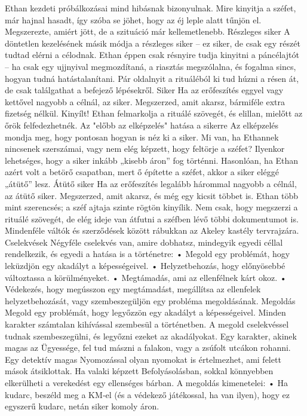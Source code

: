 \documentclass[oneside]{book}
\begin{document}
Ethan kezdeti próbálkozásai mind hibásnak bizonyulnak. Mire kinyitja a széfet, már hajnal hasadt, így szóba se jöhet, hogy az éj leple alatt tűnjön el. Megszerezte, amiért jött, de a szituáció már kellemetlenebb.
Részleges siker
A döntetlen kezelésének másik módja a részleges siker – ez siker, de csak egy részét tudtad elérni a célodnak.
Ethan éppen csak résnyire tudja kinyitni a páncélajtót – ha csak egy ujjnyival megmozdítaná, a riasztás megszólalna, és fogalma sincs, hogyan tudná hatástalanítani. Pár oldalnyit a rituáléból ki tud húzni a résen át, de csak találgathat a befejező lépésekről.
Siker
Ha az erőfeszítés eggyel vagy kettővel nagyobb a célnál, az siker.
Megszerzed, amit akarsz, bármiféle extra fizetség nélkül.
Kinyílt! Ethan felmarkolja a rituálé szövegét, és elillan, mielőtt az őrök felfedezhetnék.
Az "előbb az elképzelés" hatása a sikerre
Az elképzelés mondja meg, hogy pontosan hogyan is néz ki a siker. Mi van, ha Ethannek nincsenek szerszámai, vagy nem elég képzett, hogy feltörje a széfet? Ilyenkor lehetséges, hogy a siker inkább „kisebb áron” fog történni. Hasonlóan, ha Ethan azért volt a betörő csapatban, mert ő építette a széfet, akkor a siker eléggé „átütő” lesz.
Átütő siker
Ha az erőfeszítés legalább hárommal nagyobb a célnál, az átütő siker.
Megszerzed, amit akarsz, és még egy kicsit többet is.
Ethan több mint szerencsés; a széf ajtaja szinte rögtön kinyílik. Nem csak, hogy megszerzi a rituálé szövegét, de elég ideje van átfutni a széfben lévő többi dokumentumot is. Mindenféle váltók és szerződések között rábukkan az Akeley kastély tervrajzára.
Cselekvések
Négyféle cselekvés van, amire dobhatsz, mindegyik egyedi céllal rendelkezik, és egyedi a hatása is a történetre:
    • Megold egy problémát, hogy leküzdjön egy akadályt a képességeivel.
    • Helyzetbehozás, hogy előnyösebbé változtassa a körülményeket.
    • Megtámadás, ami az ellenfélnek kárt okoz.
    • Védekezés, hogy megússzon egy megtámadást, megállítsa az ellenfelek helyzetbehozását, vagy szembeszegüljön egy probléma megoldásának.
Megoldás
Megold egy problémát, hogy legyőzzön egy akadályt a képességeivel.
Minden karakter számtalan kihívással szembesül a történetben. A megold cselekvéssel tudnak szembeszegülni, és legyőzni ezeket az akadályokat.
Egy karakter, akinek magas az Ügyessége, fel tud mászni a falakon, vagy a zsúfolt utcákon rohanni. Egy detektív magas Nyomozással olyan nyomokat is értelmezhet, ami felett mások átsiklottak. Ha valaki képzett Befolyásolásban, sokkal könnyebben elkerülheti a verekedést egy ellenséges bárban.
A megoldás kimenetelei:
    • Ha kudarc, beszéld meg a KM‑el (és a védekező játékossal, ha van ilyen), hogy ez egyszerű kudarc, netán siker komoly áron.
\end{document}
